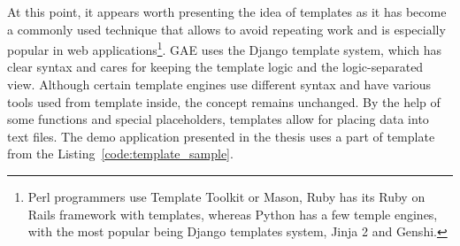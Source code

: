 At this point, it appears worth presenting the idea of templates as it has become a commonly used technique that allows to avoid repeating work and is especially popular in web applications\footnote{Perl programmers use Template Toolkit or Mason, Ruby has its Ruby on Rails framework with templates, whereas Python has a few temple engines, with the most popular being Django templates system, Jinja 2 and Genshi.}. GAE uses the Django template system, which has clear syntax and cares for keeping the template logic and the logic-separated view. Although certain template engines use different syntax and have various tools used from template inside, the concept remains unchanged. By the help of some functions and special placeholders, templates allow for placing data into text files. The demo application presented in the thesis uses a part of template from the Listing~\ref{code:template_sample}.\\ 

